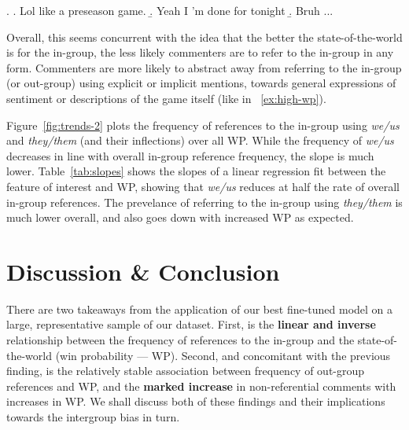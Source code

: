 \ex.\label{ex:low-wp} \a. Lol like a preseason game.
     \b. Yeah I ’m done for tonight
     \b. Bruh ...



Overall, this seems concurrent with the idea that the better the state-of-the-world is for the in-group, the less likely commenters are to refer to the in-group in any form. Commenters are more likely to abstract away from referring to the in-group (or out-group) using explicit or implicit mentions, towards general expressions of sentiment or descriptions of the game itself (like in ~\ref{ex:high-wp}).
    
Figure~\ref{fig:trends-2} plots the frequency of references to the in-group using \emph{we/us} and \emph{they/them} (and their inflections) over all WP. While the frequency of \emph{we/us} decreases in line with overall in-group reference frequency, the slope is much lower. Table~\ref{tab:slopes} shows the slopes of a linear regression fit between the feature of interest and WP, showing that \emph{we/us} reduces at half the rate of overall in-group references. The prevelance of referring to the in-group using \emph{they/them} is much lower overall, and also goes down with increased WP as expected.

\section{Discussion \& Conclusion}
\label{sec:football-conclusion}

There are two takeaways from the application of our best fine-tuned model on a large, representative sample of our dataset. First, is the \textbf{linear and inverse} relationship between the frequency of references to the in-group and the state-of-the-world (win probability --- WP). Second, and concomitant with the previous finding, is the relatively stable association between frequency of out-group references and WP, and the \textbf{marked increase} in non-referential comments with increases in WP. We shall discuss both of these findings and their implications towards the intergroup bias in turn.


